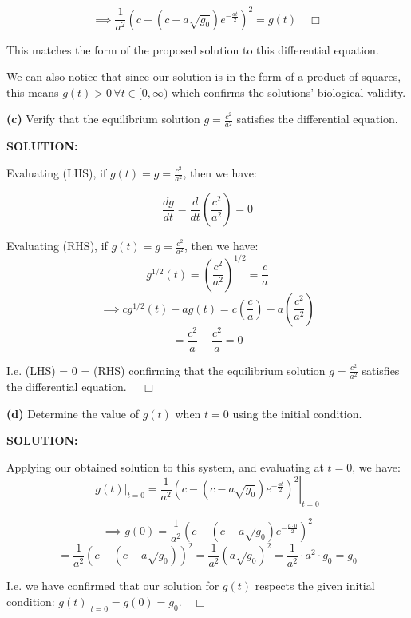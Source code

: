 \documentclass[]{article}
\begin{document}
\[
\implies \frac{1}{a^2}\left(c - \left(c - a \sqrt{g_0}\right)e^{-\frac{at}{2}}\right)^2 = g(t) \quad \Box
\]

This matches the form of the proposed solution to this differential equation.\newline

We can also notice that since our solution is in the form of a product \indent of squares, this means $g(t) > 0 \, \forall t \in [0,\infty)$ which confirms the solutions' \indent biological validity.\newline


\noindent \textbf{(c)} Verify that the equilibrium solution $g = \tfrac{c^2}{a^2}$ satisfies the differential equation.\newline

\noindent \textbf{SOLUTION:}\newline

Evaluating (LHS), if $g(t) = g = \tfrac{c^2}{a^2}$, then we have:

\[
\frac{dg}{dt} = \frac{d}{dt}\left( \frac{c^2}{a^2}\right) = 0
\]

Evaluating (RHS), if $g(t) = g = \tfrac{c^2}{a^2}$, then we have:
\[
 g^{1/2}(t) = \left(\frac{c^2}{a^2}\right)^{1/2} = \frac{c}{a}
\]
\[
\implies c g^{1/2}(t) - a g(t)= c \left(\frac{c}{a}\right) - a\left( \frac{c^2}{a^2}\right)
\]
\[
= \frac{c^2}{a} - \frac{c^2}{a} = 0
\]

I.e. (LHS) = 0 = (RHS) confirming that the equilibrium solution $g = \tfrac{c^2}{a^2}$ \indent satisfies the differential equation. $\quad \Box$ \newline


\noindent \textbf{(d)} Determine the value of $g(t)$ when $t = 0$ using the initial condition.\newline

\noindent \textbf{SOLUTION:}\newline

Applying our obtained solution to this system, and evaluating at $t=0$, we \indent have:
\[
\left. g(t)\right|_{t=0} = \left. \frac{1}{a^2}\left(c - \left(c - a \sqrt{g_0}\right)e^{-\frac{at}{2}}\right)^2 \right|_{t=0}
\]

\[
\implies g(0) = \frac{1}{a^2}\left(c - \left(c - a \sqrt{g_0}\right)e^{-\frac{a\cdot 0}{2}}\right)^2 
\]
\[
= \frac{1}{a^2}\left(c - \left(c - a \sqrt{g_0}\right)\right)^2 =\frac{1}{a^2} \left(a \sqrt{g_0}\right)^2  =\frac{1}{a^2} \cdot a^2 \cdot g_0 = g_0 
\]

I.e. we have confirmed that our solution for $g(t)$ respects the given initial \indent condition: $\left.g(t)\right|_{t=0} = g(0) = g_0.\quad \Box $ \newline
\end{document}
